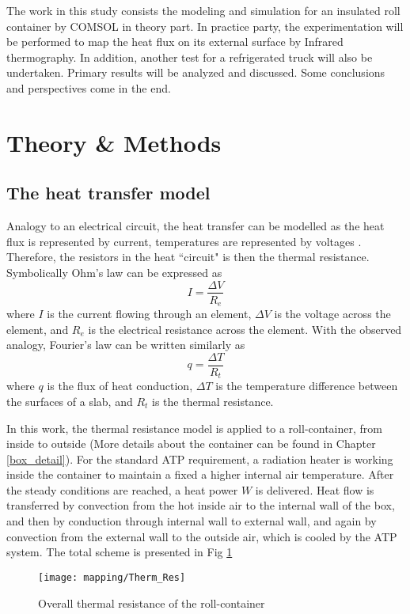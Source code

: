 The work in this study consists the modeling and simulation for an insulated roll container by COMSOL in theory part. In practice party, the experimentation will be performed to map the heat flux on its external surface by Infrared thermography. In addition, another test for a refrigerated truck will also be undertaken. Primary results will be analyzed and discussed. Some conclusions and perspectives come in the end.


\section{Theory \& Methods}
\subsection{The heat transfer model}
Analogy to an electrical circuit, the heat transfer can be modelled as the heat flux is represented by current, temperatures are represented by voltages \citep{Therm_Re}. Therefore, the resistors in the heat ``circuit" is then the thermal resistance. Symbolically Ohm’s law can be expressed as
\begin{equation}
I = \frac{\Delta V}{R_e}
\end{equation}
where $I$ is the current flowing through an element, $\Delta V$ is the voltage across the element, and $R_e$ is the electrical resistance across the element. With the observed analogy, Fourier’s law can be written similarly as
\begin{equation}
q = \frac{\Delta T}{R_t}
\end{equation}
where $q$ is the flux of heat conduction, $\Delta T$ is the temperature difference between the surfaces of a slab, and $R_t$ is the thermal resistance.

In this work, the thermal resistance model is applied to a roll-container, from inside to outside (More details about the container can be found in Chapter \ref{box_detail}). For the standard ATP requirement, a radiation heater is working inside the container to maintain a fixed a higher internal air temperature. After the steady conditions are reached, a heat power $W$ is delivered. Heat flow is transferred by convection from the hot inside air to the internal wall of the box, and then by conduction through internal wall to external wall, and again by convection from the external wall to the outside air, which is cooled by the ATP system. The total scheme is presented in Fig \ref{Therm_Res}
\begin{figure}[!htpb]
	\centering
	\texttt{[image: mapping/Therm\_Res]}
	\caption{Overall thermal resistance of the roll-container}
	\label{Therm_Res}
\end{figure}

